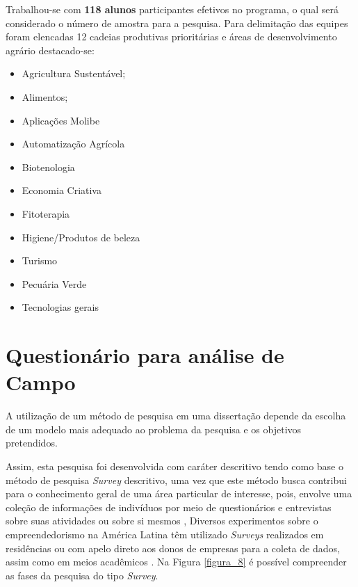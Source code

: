 Trabalhou-se com \textbf{118 alunos} participantes efetivos no programa, o qual será considerado o número de amostra para a pesquisa. Para delimitação das equipes foram elencadas 12 cadeias produtivas  prioritárias e áreas de desenvolvimento agrário destacado-se:

\begin{multicols}{2}
\centering
    \begin{itemize}
    \item{Agricultura Sustentável;}
    \item{Alimentos;}
    \item{Aplicações Molibe}
    \item{Automatização Agrícola}
    \item{Biotenologia}
    \item{Economia Criativa}
    \item{Fitoterapia}
    \item{Higiene/Produtos de beleza}
    \item{Turismo}
    \item{Pecuária Verde}
    \item{Tecnologias gerais}
\end{itemize}
\end{multicols}

\section{Questionário para análise de Campo}

A utilização de um método de pesquisa em uma dissertação depende da escolha de um modelo mais adequado ao problema da pesquisa e os objetivos pretendidos.

Assim, esta pesquisa foi desenvolvida com caráter descritivo tendo como base o método de pesquisa \textit{Survey} descritivo, uma vez que este método busca contribui para o conhecimento geral de uma área particular de interesse, pois, envolve uma coleção de informações de indivíduos por meio de questionários e entrevistas sobre suas atividades ou sobre si mesmos \cite{forza_survey_2002}, Diversos experimentos sobre o empreendedorismo na América Latina têm utilizado  \textit{Surveys} realizados em residências ou com apelo direto aos donos de empresas para a coleta de dados, assim como em meios acadêmicos \cite{lima_ser_2015}. Na Figura \ref{figura_8} é possível compreender as fases da pesquisa do tipo \textit{Survey}.


